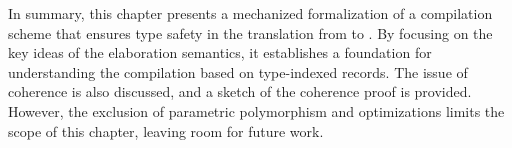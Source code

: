 In summary, this chapter presents a mechanized formalization of a compilation
scheme that ensures type safety in the translation from \lambdaiplus to
\lambdar. By focusing on the key ideas of the elaboration semantics, it
establishes a foundation for understanding the compilation based on type-indexed
records. The issue of coherence is also discussed, and a sketch of the coherence
proof is provided. However, the exclusion of parametric polymorphism and
optimizations limits the scope of this chapter, leaving room for future work.
